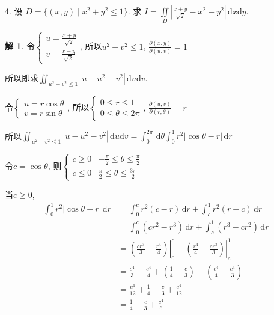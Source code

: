 \documentclass[a4paper,12pt]{article}
\theoremstyle{definition}
\newtheorem*{sol}{解}
\begin{document}
4. 设 $D = \{(x,y) \mid x^2 + y^2 \leq 1\}$. 求 $\displaystyle I = \iint\limits_{D} \left| \frac{x + y}{\sqrt{2}} - x^2 - y^2 \right| \, \mathrm{d}x\mathrm{d}y$.
\begin{sol}
    令$\begin{cases}
            u=\frac{x+y}{\sqrt{2}} \\
            v=\frac{x-y}{\sqrt{2}}
        \end{cases}$, 所以$u^2+v^2\leq 1$, $\frac{\partial(x,y)}{\partial(u,v)}=1$

    所以即求$\iint_{u^2+v^2\leq 1} \left| u - u^2 - v^2 \right| \, \mathrm{d}u\mathrm{d}v$.

    令$\begin{cases}
            u=r\cos\theta \\
            v=r\sin\theta
        \end{cases}$, 所以$\begin{cases}
            0\leq r\leq 1 \\
            0\leq \theta\leq 2\pi
        \end{cases}$, $\frac{\partial(u,v)}{\partial(r,\theta)}=r$

    所以$\iint_{u^2+v^2\leq 1} \left| u - u^2 - v^2 \right| \, \mathrm{d}u\mathrm{d}v=\int_0^{2\pi}\,\mathrm{d}\theta\int_0^1 r^2\left|\cos\theta - r\right|\,\mathrm{d}r$

    令$c=\cos\theta$, 则$\begin{cases}
            c\geq 0 & -\frac{\pi}{2}\leq\theta\leq\frac{\pi}{2} \\
            c\leq 0 & \frac{\pi}{2}\leq\theta\leq\frac{3\pi}{2}
        \end{cases}$

    当$c\geq0$,
    \begin{align*}
        \int_0^1 r^2|\cos\theta-r|\,\mathrm{d}r
         & =\int_0^c r^2(c-r)\,\mathrm{d}r+\int_c^1 r^2(r-c)\,\mathrm{d}r                                                                  \\
         & =\int_0^c (c r^2 - r^3)\,\mathrm{d}r+\int_c^1 (r^3 - c r^2)\,\mathrm{d}r                                                        \\
         & =\left.\left(\frac{c r^3}{3} - \frac{r^4}{4} \right)\right|_0^c+\left.\left( \frac{r^4}{4} - \frac{c r^3}{3} \right)\right|_c^1 \\
         & =\frac{c^4}{3} - \frac{c^4}{4}+\left(\frac14 - \frac{c}{3}\right) - \left(\frac{c^4}{4} - \frac{c^4}{3}\right)                  \\
         & =\frac{c^4}{12}+\frac14 - \frac{c}{3} + \frac{c^4}{12}                                                                          \\
         & =\frac14 - \frac{c}{3} + \frac{c^4}{6}
    \end{align*}


\end{sol}
\end{document}
